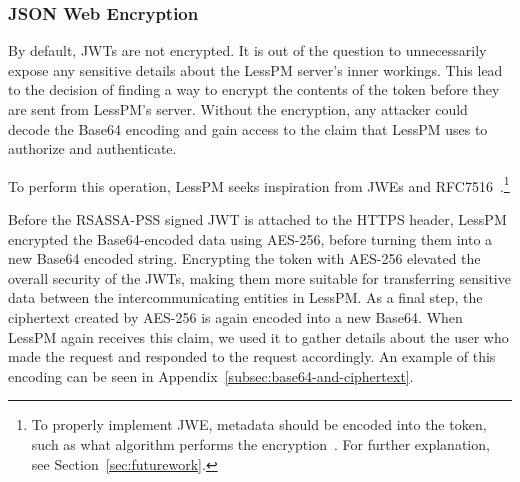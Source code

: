 \subsubsection{JSON Web Encryption}
By default, JWTs are not encrypted.
It is out of the question to unnecessarily expose any sensitive details about
the LessPM server's inner workings.
This lead to the decision of finding a way to encrypt the contents of the 
token before they are sent from LessPM's server.
Without the encryption, any attacker could decode the Base64 encoding and
gain access to the claim that LessPM uses to authorize and authenticate.

To perform this operation, LessPM seeks inspiration from JWEs and
RFC7516~\cite{rfc7516}.\footnote{
  To properly implement JWE, metadata should be encoded into the token, such as
  what algorithm performs the encryption~\cite{rfc7516}. For further
  explanation, see Section~\ref{sec:futurework}.
}

Before the RSASSA-PSS signed JWT is attached to the HTTPS header,
LessPM encrypted the Base64-encoded data using AES-256, before turning them into
a new Base64 encoded string.
Encrypting the token with AES-256 elevated the overall security of the
JWTs, making them more suitable for transferring sensitive data between the
intercommunicating entities in LessPM\@.
As a final step, the ciphertext created by AES-256 is again encoded into a
new Base64.
When LessPM again receives this claim, we used it to gather details about the
user who made the request and responded to the request accordingly.
An example of this encoding can be seen in
Appendix~\ref{subsec:base64-and-ciphertext}.

